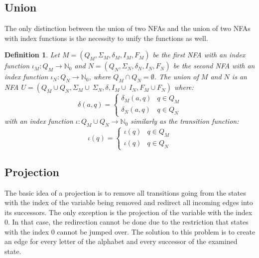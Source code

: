 \documentclass[pdflatex,sn-mathphys-num]{sn-jnl}%
\theoremstyle{thmstyleone}%
\theoremstyle{thmstyletwo}%
\theoremstyle{thmstylethree}%
\newtheorem{definition}{Definition}%
\begin{document}
    \subsection{Union}
        The only distinction between the union of two NFAs and the union of two NFAs with index functions is the necessity to unify the functions as well.

        \vspace*{0.5em}

        \begin{definition}
            Let $M = (Q_M, \Sigma_M, \delta_M, I_M, F_M)$ be the first NFA with an index function $\iota_M : Q_M \rightarrow \mathbb{N}_0$ and $N = (Q_N, \Sigma_N, \delta_N, I_N, F_N)$ be the second NFA with an index function $\iota_N : Q_N \rightarrow \mathbb{N}_0$, where $Q_M \cap Q_N = \emptyset$. The union of $M$ and $N$ is an NFA $U = (Q_M \cup Q_N, \Sigma_M \cup~\Sigma_N, \delta, I_M \cup~I_N, F_M \cup F_N)$ where:
            $$
            \delta(a, q) =
            \begin{cases}
                \delta_M(a, q) & q \in Q_M\\
                \delta_N(a, q) & q \in Q_N
            \end{cases}
            $$
            with an  index function $\iota : Q_M \cup Q_N \rightarrow \mathbb{N}_0$ similarly as the transition function:
            $$
            \iota(q) =
            \begin{cases}
                \iota(q) & q \in Q_M\\
                \iota(q) & q \in Q_N
            \end{cases}
            $$
        \end{definition}

    \subsection{Projection}
        The basic idea of a projection is to remove all transitions going from the states with the index of the variable being removed and redirect all incoming edges into its successors. The only exception is the projection of the variable with the index 0. In that case, the redirection cannot be done due to the restriction that states with the index 0 cannot be jumped over. The solution to this problem is to create an edge for every letter of the alphabet and every successor of the examined state.
\end{document}

